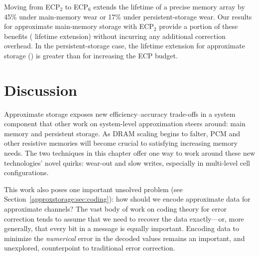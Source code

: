 Moving from ECP$_2$ to ECP$_6$ extends the lifetime of a precise memory array
by 45\% under main-memory wear or 17\% under persistent-storage wear.
Our
results for approximate main-memory storage with ECP$_2$ provide a
portion of these benefits ( lifetime extension)
without incurring any
additional correction overhead. In the persistent-storage case, the
lifetime extension for approximate storage () is greater than for
increasing the ECP budget.




\section{Discussion}
\label{approxstorage:sec:conclusion}

Approximate storage exposes new efficiency--accuracy trade-offs in a system
component that other work on system-level approximation steers around:
main memory and persistent storage.
As DRAM scaling begins to falter, PCM and other resistive memories will become
crucial to satisfying increasing memory needs.
The two techniques in this chapter offer one way to work around these new
technologies' novel quirks:
wear-out and slow
writes, especially in multi-level cell configurations.

This work also poses one important unsolved problem (see
Section~\ref{approxstorage:sec:coding}):
how should we encode approximate data for approximate channels?
The vast body of work on coding theory for error correction tends to assume
that we need to recover the data exactly---or, more generally, that every bit
in a message is equally important.
Encoding data to minimize the \emph{numerical} error in the decoded values
remains an important, and unexplored, counterpoint to traditional
error correction.
